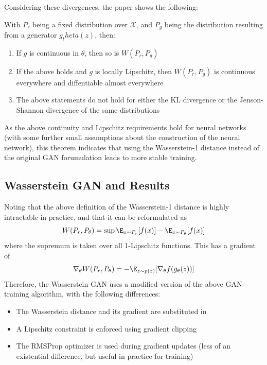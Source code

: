 Considering these divergences, the paper shows the following:

\begin{theorem}
    With $P_r$ being a fixed distribution over $\mathcal{X}$, and $P_g$ being the distribution resulting from a generator $g_theta(z)$, then:
    \begin{enumerate}
        \item If $g$ is continuous in $\theta$, then so is $W(P_r, P_g)$
        \item If the above holds and $g$ is locally Lipschitz, then $W(P_r, P_g)$ is continuous everywhere and diffentiable almost everywhere
        \item The above statements do not hold for either the KL divergence or the Jenson-Shannon divergence of the same distributions
    \end{enumerate}
\end{theorem}
As the above continuity and Lipschitz requirements hold for neural networks (with some further small assumptions about the construction of the neural network), this theorem indicates that using the Wasserstein-1 distance instead of the original GAN forumulation leads to more stable training.

\subsection{Wasserstein GAN and Results}
Noting that the above definition of the Wasserstein-1 distance is highly intractable in practice, and that it can be reformulated as
$$W(P_r, P_\theta) = \sup \E_{x \sim P_r}[f(x)] - \E_{x \sim P_\theta}[f(x)]$$
where the supremum is taken over all 1-Lipschitz functions. This has a gradient of
$$\nabla_\theta W(P_r,P_\theta)  = -\E_{z \sim p(z)}[\nabla_\theta f(g_\theta(z))]$$
Therefore, the Wasserstein GAN uses a modified version of the above GAN training algorithm, with the following differences:
\begin{itemize}
    \item The Wasserstein distance and its gradient are substituted in
    \item A Lipschitz constraint is enforced using gradient clipping
    \item The RMSProp optimizer is used during gradient updates (less of an existential difference, but useful in practice for training)
\end{itemize}

